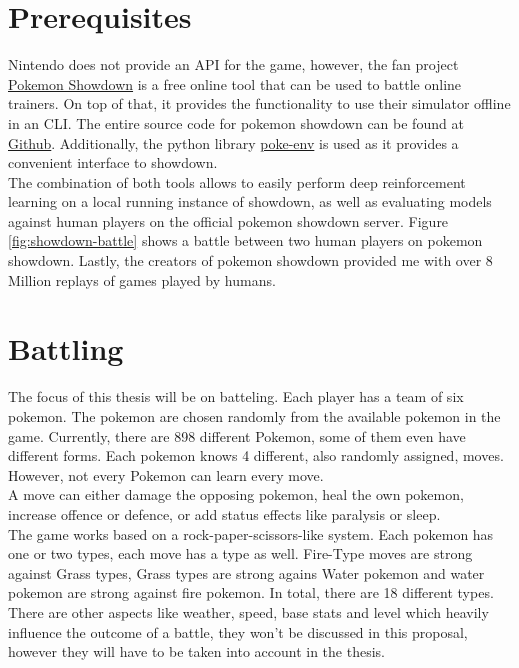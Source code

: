 \documentclass{article}
\begin{document}
\section{Prerequisites}
Nintendo does not provide an API for the game, however, the fan project
\href{https://play.pokemonshowdown.com/}{Pokemon Showdown} is a
free online tool that can be used to battle online trainers. On top of that,
it provides the functionality to use their simulator offline in an CLI. The
entire source code for pokemon showdown can be found at 
\href{https://github.com/smogon/pokemon-showdown}{Github}.
Additionally, the python library \href{https://poke-env.readthedocs.io/en/latest/}{poke-env}
is used as it provides a convenient interface to showdown. \\
The combination of both tools allows to easily perform deep reinforcement learning
on a local running instance of showdown, as well as evaluating models against 
human players on the official pokemon showdown server. Figure \ref{fig:showdown-battle}
shows a battle between two human players on pokemon showdown. Lastly, the creators
of pokemon showdown provided me with over 8 Million replays of games played
by humans.

\section{Battling}
The focus of this thesis will be on batteling. Each player has a team of six 
pokemon. The pokemon are chosen randomly from the available
pokemon in the game. Currently, there are 898 different Pokemon, some of them 
even have different forms. Each pokemon knows 4 different, also randomly assigned,
moves. However, not every Pokemon can learn every move. \\
A move can either damage the opposing pokemon, heal the own pokemon, increase offence
or defence, or add status effects like paralysis or sleep. \\
The game works based on a rock-paper-scissors-like system. Each pokemon has one
or two types, each move has a type as well. Fire-Type moves are strong against
Grass types, Grass types are strong agains Water pokemon and water pokemon
are strong against fire pokemon. In total, there are 18 different types. \\
There are other aspects like weather, speed, base stats and level which
heavily influence the outcome of a battle, they won't be discussed in 
this proposal, however they will have to be taken into account in the thesis.
\end{document}
